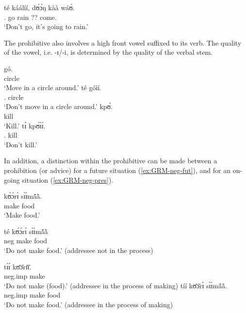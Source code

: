 \ea\label{GRM-neg-imp-vp15.10.}
\gll té káálíí, dʊ́ɔ́ŋ kàà wáʊ̀.\\
  {\neg.\imp} go rain ?{\ipfv}? come.{\foc}\\
\glt  `Don't go, it's going to rain.' 
\z
 
The prohibitive also involves a high front vowel  suffixed to its verb. The 
quality of the vowel, i.e. {\sls -ɪ}/{\sls -i}, is determined by the quality of 
the verbal stem.

\begin{multicols}{2}
\ea\label{ex:GRM-neg-imperative}
\ea 
\gll gó.\\
circle\\
\glt  `Move in a circle around.'
\ex 
\gll  té   góìí.\\
{\neg.\imp} circle\\
\glt  `Don't move in a circle around.'
\columnbreak
\ex  
\gll kpʊ́.\\
kill\\
\glt `Kill.'
\ex
\gll tɪ́ kpʊ́ɪ̀ɪ́.\\
{\neg.\imp} kill\\
\glt `Don't kill.'
\z 

 \z
 \end{multicols}

In addition, a distinction within the prohibitive can be made
between a prohibition (or advice) for a future situation  
(\ref{ex:GRM-neg-fut}), 
and  for an on-going situation (\ref{ex:GRM-neg-pres}). 


\begin{multicols}{2}
 
 

\ea\label{ex:GRM-neg-fut-pres}

 \ea\label{ex:GRM-neg-fut}
\gll  kʊ̀ɔ̀rɪ̀ sɪ̀ɪ̀mã́ã̀.\\
  make food\\
 \glt `Make food.'
 
 
 \ex\label{ex:GRM-neg-pres}
\gll  té kʊ́ɔ́rɪ́ sɪ̀ɪ̀mã́ã̀\\ 
{\sc neg}  make food\\
 \glt `Do not make food.' (addressee not in the process)
 \vfill
 \columnbreak
 
  \ex\label{ex:GRM-neg-pres}
  \gll  tɪ́ɪ́ kʊ̄ɔ̄rɪ̄ɪ̄.\\
 {\sc neg.imp}  make\\
 \glt `Do not make (food).' (addressee in the process of making)
   \ex\label{ex:GRM-neg-pres}
  \gll  tíí kʊ̄ɔ̄rɪ̀  sɪ̀ɪ̀mã́ã̀.\\
 {\sc neg.imp}  make  food\\
 \glt `Do not make food.' (addressee in the process of making)
\z
\z

\end{multicols}



